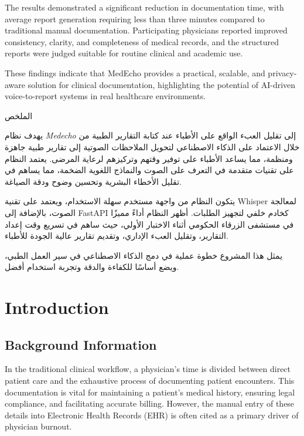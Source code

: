 \documentclass[12pt,a4paper]{article}
\begin{document}
The results demonstrated a significant reduction in documentation time, with average report generation requiring less than three minutes compared to traditional manual documentation. Participating physicians reported improved consistency, clarity, and completeness of medical records, and the structured reports were judged suitable for routine clinical and academic use.

These findings indicate that MedEcho provides a practical, scalable, and privacy-aware solution for clinical documentation, highlighting the potential of AI-driven voice-to-report systems in real healthcare environments.

\vspace{1cm}

\begin{center}
\textarabic{\Large الملخص}
\end{center}

\begin{otherlanguage}{arabic}
يهدف نظام \textit{Medecho} إلى تقليل العبء الواقع على الأطباء عند كتابة التقارير الطبية 
من خلال الاعتماد على الذكاء الاصطناعي لتحويل الملاحظات الصوتية إلى تقارير طبية جاهزة 
ومنظمة، مما يساعد الأطباء على توفير وقتهم وتركيزهم لرعاية المرضى. يعتمد النظام على 
تقنيات متقدمة في التعرف على الصوت والنماذج اللغوية الضخمة، مما يساهم في تقليل الأخطاء 
البشرية وتحسين وضوح ودقة الصياغة.

يتكون النظام من واجهة مستخدم سهلة الاستخدام، ويعتمد على تقنية Whisper لمعالجة الصوت، 
بالإضافة إلى FastAPI كخادم خلفي لتجهيز الطلبات. أظهر النظام أداءً مميزًا في مستشفى 
الزرقاء الحكومي أثناء الاختبار الأولي، حيث ساهم في تسريع وقت إعداد التقارير، وتقليل 
العبء الإداري، وتقديم تقارير عالية الجودة للأطباء.

يمثل هذا المشروع خطوة عملية في دمج الذكاء الاصطناعي في سير العمل الطبي، ويضع أساسًا 
للكفاءة والدقة وتجربة استخدام أفضل.
\end{otherlanguage}

\newpage
\tableofcontents
\newpage

\section{Introduction}

\subsection{Background Information}
In the traditional clinical workflow, a physician's time is divided between direct patient care and the exhaustive process of documenting patient encounters. This documentation is vital for maintaining a patient's medical history, ensuring legal compliance, and facilitating accurate billing. However, the manual entry of these details into Electronic Health Records (EHR) is often cited as a primary driver of physician burnout. 
\end{document}
